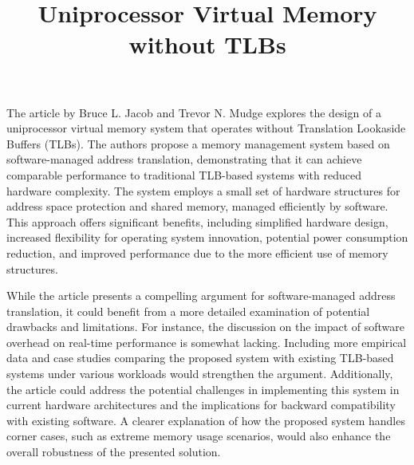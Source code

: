 \documentclass{article}
\title{Uniprocessor Virtual Memory without TLBs}
\begin{document}
\maketitle
The article by Bruce L. Jacob and Trevor N. Mudge explores the design of a
uniprocessor virtual memory system that operates without Translation Lookaside
Buffers (TLBs). The authors propose a memory management system based on
software-managed address translation, demonstrating that it can achieve
comparable performance to traditional TLB-based systems with reduced hardware
complexity. The system employs a small set of hardware structures for address
space protection and shared memory, managed efficiently by software. This
approach offers significant benefits, including simplified hardware design,
increased flexibility for operating system innovation, potential power
consumption reduction, and improved performance due to the more efficient use of
memory structures.

While the article presents a compelling argument for software-managed address
translation, it could benefit from a more detailed examination of potential
drawbacks and limitations. For instance, the discussion on the impact of
software overhead on real-time performance is somewhat lacking. Including more
empirical data and case studies comparing the proposed system with existing
TLB-based systems under various workloads would strengthen the argument.
Additionally, the article could address the potential challenges in implementing
this system in current hardware architectures and the implications for backward
compatibility with existing software. A clearer explanation of how the proposed
system handles corner cases, such as extreme memory usage scenarios, would also
enhance the overall robustness of the presented solution.
\end{document}

